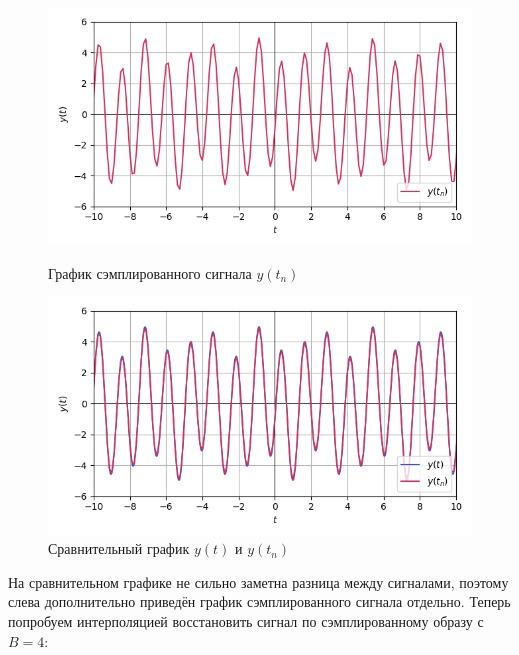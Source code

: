 \documentclass[a4paper]{article}
\begin{document}
\begin{figure}[H]
    \begin{minipage}{0.49\textwidth}
        \centering \includegraphics[width=\textwidth]{sources/second/sins dt=0.125 B=4/2_y_sampled.png}
        \caption{График сэмплированного сигнала $y(t_n)$}
    \end{minipage}\hfill
    \begin{minipage}{0.49\textwidth}
        \centering \includegraphics[width=\textwidth]{sources/second/sins dt=0.125 B=4/3_y_cmp(sampling).png}
        \caption{Сравнительный график $y(t)$ и $y(t_n)$}
    \end{minipage}
\end{figure}
На сравнительном графике не сильно заметна разница между сигналами, поэтому слева дополнительно приведён график сэмплированного сигнала отдельно. Теперь попробуем интерполяцией восстановить сигнал по сэмплированному образу с $B = 4$:
\end{document}
